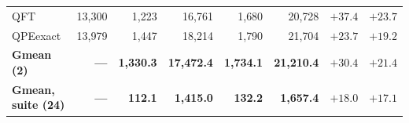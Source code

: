 \begin{table}[t]
\begin{tabular}{@{}lrrrrrrr@{}}
QFT & 13{,}300 & 1{,}223 & 16{,}761 & 1{,}680 & 20{,}728 & $+37.4$ & $+23.7$ \\
QPEexact & 13{,}979 & 1{,}447 & 18{,}214 & 1{,}790 & 21{,}704 & $+23.7$ & $+19.2$ \\
\cmidrule(l{0pt}r{0pt}){1-8}
\textbf{Gmean (2)} & \textbf{---} & \textbf{1{,}330.3} & \textbf{17{,}472.4} & \textbf{1{,}734.1} & \textbf{21{,}210.4} & $\mathbf{+30.4}$ & $\mathbf{+21.4}$ \\
\midrule
\textbf{Gmean, suite (24)} & \textbf{---} & \textbf{112.1} & \textbf{1{,}415.0} & \textbf{132.2} & \textbf{1{,}657.4} & $\mathbf{+18.0}$ & $\mathbf{+17.1}$ \\
\bottomrule
\end{tabular}
\end{table}
